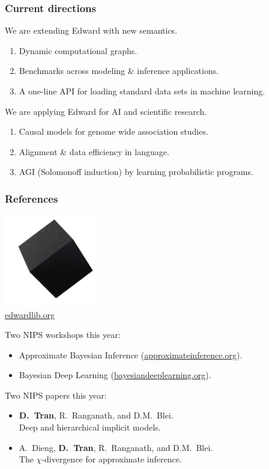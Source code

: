 \documentclass[10pt,
               xcolor={usenames,dvipsnames},
               hyperref={colorlinks,linktoc=all,citecolor=Plum,linkcolor=MidnightBlue,urlcolor=MidnightBlue},noamssymb]{beamer}
\begin{document}
\begin{frame}
\frametitle{Current directions}

We are extending Edward with new semantics.
\begin{enumerate}
\item
Dynamic computational graphs.
\item
Benchmarks across modeling \& inference applications.
\item
A one-line API for loading standard data sets in machine learning.
\end{enumerate}
\vspace{3ex}

We are applying Edward for AI and scientific research.
\begin{enumerate}
\item
Causal models for genome wide association studies. 
\item
Alignment \& data efficiency in language.
\item
AGI (Solomonoff induction) by learning probabilistic programs.
\end{enumerate}
\end{frame}

\begin{frame}
\frametitle{References}
\vspace{-1.5ex}
\begin{center}
\includegraphics[width=0.3\textwidth]{img/edward.png}
\\
\large \url{edwardlib.org}
\end{center}
\vspace{1ex}

Two NIPS workshops this year:
\begin{itemize}
\item
Approximate Bayesian Inference
(\url{approximateinference.org}).
\item
Bayesian Deep Learning
(\url{bayesiandeeplearning.org}).
\end{itemize}

Two NIPS papers this year:
\begin{itemize}
\item
\textbf{D.~Tran}, R.~Ranganath, and D.M.~Blei. \\
Deep and hierarchical implicit models. \\
\item
A.~Dieng, \textbf{D.~Tran}, R.~Ranganath, and D.M.~Blei. \\
The $\chi$-divergence for approximate inference. \\
\end{itemize}
\end{frame}
\end{document}
